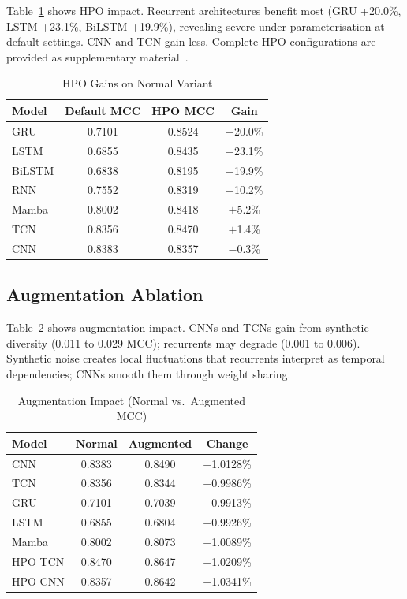 Table~\ref{tab:hpo_gains} shows HPO impact. Recurrent architectures benefit most (GRU +20.0\%, LSTM +23.1\%, BiLSTM +19.9\%), revealing severe under-parameterisation at default settings. CNN and TCN gain less. Complete HPO configurations are provided as supplementary material~\cite{githubrepo}.

\begin{table}
    \centering
    \caption{HPO Gains on Normal Variant}
    \label{tab:hpo_gains}
    \begin{tabular}{lccc}\toprule
        Model  & Default MCC & HPO MCC & Gain      \\\midrule
        GRU    & 0.7101      & 0.8524  & $+$20.0\% \\
        LSTM   & 0.6855      & 0.8435  & $+$23.1\% \\
        BiLSTM & 0.6838      & 0.8195  & $+$19.9\% \\
        RNN    & 0.7552      & 0.8319  & $+$10.2\% \\
        Mamba  & 0.8002      & 0.8418  & $+$5.2\%  \\
        TCN    & 0.8356      & 0.8470  & $+$1.4\%  \\
        CNN    & 0.8383      & 0.8357  & $-$0.3\%  \\\bottomrule
    \end{tabular}
\end{table}

\subsection{Augmentation Ablation}

Table~\ref{tab:augmentation} shows augmentation impact. CNNs and TCNs gain from synthetic diversity (0.011 to 0.029 MCC); recurrents may degrade (0.001 to 0.006). Synthetic noise creates local fluctuations that recurrents interpret as temporal dependencies; CNNs smooth them through weight sharing.

\begin{table}
    \centering
    \caption{Augmentation Impact (Normal vs.\ Augmented MCC)}
    \label{tab:augmentation}
    \begin{tabular}{lccc}\toprule
        Model   & Normal & Augmented & Change      \\\midrule
        CNN     & 0.8383 & 0.8490    & $+$1.0128\% \\
        TCN     & 0.8356 & 0.8344    & $-$0.9986\% \\
        GRU     & 0.7101 & 0.7039    & $-$0.9913\% \\
        LSTM    & 0.6855 & 0.6804    & $-$0.9926\% \\
        Mamba   & 0.8002 & 0.8073    & $+$1.0089\% \\
        HPO TCN & 0.8470 & 0.8647    & $+$1.0209\% \\
        HPO CNN & 0.8357 & 0.8642    & $+$1.0341\% \\\bottomrule
    \end{tabular}
\end{table}

